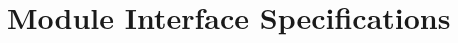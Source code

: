 \documentclass[12pt, titlepage]{article}
\begin{document}
\section{Module Interface Specifications}












\end{document}
